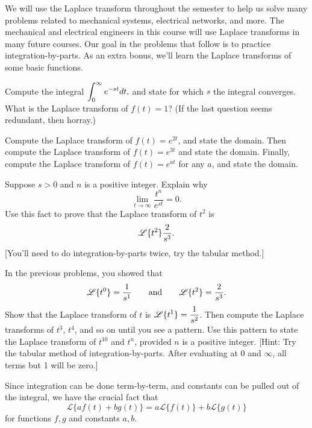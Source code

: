 We will use the Laplace transform throughout the semester to help us solve many problems related to mechanical systems, electrical networks, and more. The mechanical and electrical engineers in this course will use Laplace transforms in many future courses. Our goal in the problems that follow is to practice integration-by-parts.  As an extra bonus, we'll learn the Laplace transforms of some basic functions.


\begin{problem}
Compute the integral $\displaystyle\int_0^\infty e^{-st}dt,$ and state for which $s$ the integral converges. 
What is the Laplace transform of $f(t)=1$? (If the last question seems redundant, then horray.)
\end{problem}
\begin{problem}
Compute the Laplace transform of $f(t)=e^{2t}$, and state the domain.  
Then compute the Laplace transform of $f(t)=e^{3t}$ and state the domain.
Finally, compute the Laplace transform of $f(t)=e^{at}$ for any $a$, and state the domain.
\end{problem}

\begin{problem}
 Suppose $s>0$ and $n$ is a positive integer.  Explain why $$\lim_{t\to\infty}\frac{t^n}{e^{st}}=0.$$ Use this fact to prove that the Laplace transform of $t^2$ is $$\displaystyle\mathscr{L}\{t^2\} \frac{2}{s^3}.$$ [You'll need to do integration-by-parts twice, try the tabular method.]
\end{problem}


\begin{problem}
 In the previous problems, you showed that 
$$\displaystyle\mathscr{L}\{t^0\} = \frac{1}{s^1}
\quad\quad \text{and}\quad\quad 
\mathscr{L}\{t^2\} = \frac{2}{s^3}.$$ 
Show that the Laplace transform of $t$ is $\displaystyle\mathscr{L}\{t^1\} = \frac{1}{s^2}$.
Then compute the Laplace transforms of $t^3$, $t^4$, and so on until you see a pattern. 
Use this pattern to state the Laplace transform of $t^10$ and $t^n$, provided $n$ is a positive integer.
[Hint: Try the tabular method of integration-by-parts. After evaluating at 0 and $\infty$, all terms but 1 will be zero.]
\end{problem}

\begin{theorem}
Since integration can be done term-by-term, and constants can be pulled out of the integral, we have the crucial fact that $$\mathscr{L}\{af(t)+bg(t)\}=a\mathscr{L}\{f(t)\}+b\mathscr{L}\{g(t)\}$$ for functions $f,g$ and constants $a,b$.  
\end{theorem}

